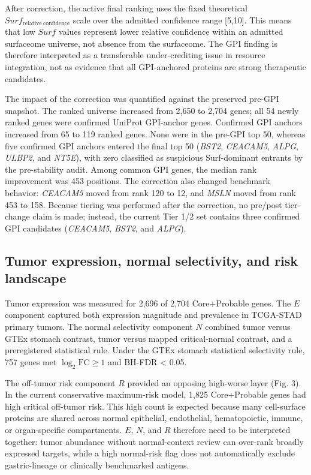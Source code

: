 \documentclass[twocolumn]{article}
\begin{document}
After correction, the active final ranking uses the fixed theoretical $Surf_{\mathrm{relative\ confidence}}$ scale over the admitted confidence range [5,10]. This means that low $Surf$ values represent lower relative confidence within an admitted surfaceome universe, not absence from the surfaceome. The GPI finding is therefore interpreted as a transferable under-crediting issue in resource integration, not as evidence that all GPI-anchored proteins are strong therapeutic candidates.

The impact of the correction was quantified against the preserved pre-GPI snapshot. The ranked universe increased from 2,650 to 2,704 genes; all 54 newly ranked genes were confirmed UniProt GPI-anchor genes. Confirmed GPI anchors increased from 65 to 119 ranked genes. None were in the pre-GPI top 50, whereas five confirmed GPI anchors entered the final top 50 (\textit{BST2}, \textit{CEACAM5}, \textit{ALPG}, \textit{ULBP2}, and \textit{NT5E}), with zero classified as suspicious Surf-dominant entrants by the pre-stability audit. Among common GPI genes, the median rank improvement was 453 positions. The correction also changed benchmark behavior: \textit{CEACAM5} moved from rank 120 to 12, and \textit{MSLN} moved from rank 453 to 158. Because tiering was performed after the correction, no pre/\allowbreak{}post tier-change claim is made; instead, the current Tier 1/\allowbreak{}2 set contains three confirmed GPI candidates (\textit{CEACAM5}, \textit{BST2}, and \textit{ALPG}).

\subsection{Tumor expression, normal selectivity, and risk landscape}

Tumor expression was measured for 2,696 of 2,704 Core+\allowbreak{}Probable genes. The $E$ component captured both expression magnitude and prevalence in TCGA-STAD primary tumors. The normal selectivity component $N$ combined tumor versus GTEx stomach contrast, tumor versus mapped critical-normal contrast, and a preregistered statistical rule. Under the GTEx stomach statistical selectivity rule, 757 genes met $\log_2\mathrm{FC}\geq 1$ and BH-FDR < 0.05.

The off-tumor risk component $R$ provided an opposing high-worse layer (Fig. 3). In the current conservative maximum-risk model, 1,825 Core+\allowbreak{}Probable genes had high critical off-tumor risk. This high count is expected because many cell-surface proteins are shared across normal epithelial, endothelial, hematopoietic, immune, or organ-specific compartments. $E$, $N$, and $R$ therefore need to be interpreted together: tumor abundance without normal-context review can over-rank broadly expressed targets, while a high normal-risk flag does not automatically exclude gastric-lineage or clinically benchmarked antigens.
\end{document}

